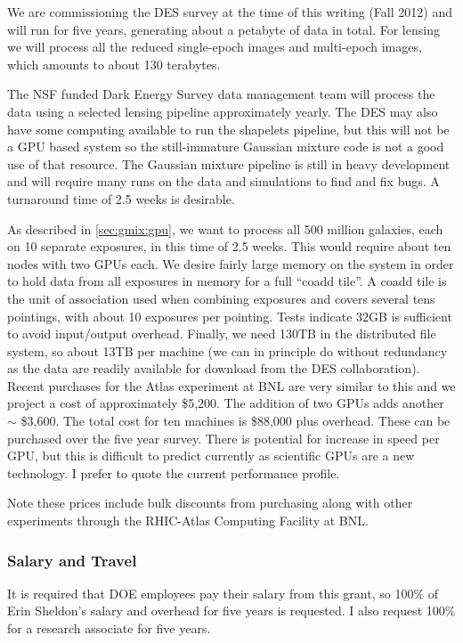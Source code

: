 \documentclass[12pt]{article}
\newcommand{\commissdate}{Fall 2012}
\begin{document}
We are commissioning the DES survey at the time of this writing (\commissdate)
and will run for five years, generating about a petabyte of data in total.  For
lensing we will process all the reduced single-epoch images and multi-epoch
images, which amounts to about 130 terabytes.

The NSF funded Dark Energy Survey data management team will process the data
using a selected lensing pipeline approximately yearly.  The DES may also have
some computing available to run the shapelets pipeline, but this will not be a
GPU based system so the still-immature Gaussian mixture code is not a good use
of that resource.  The Gaussian mixture pipeline is still in heavy development
and will require many runs on the data and simulations to find and fix bugs.  A
turnaround time of 2.5 weeks is desirable.

As described in \ref{sec:gmix:gpu}, we want to process all 500 million
galaxies, each on 10 separate exposures, in this time of 2.5 weeks. This would
require about ten nodes with two GPUs each.  We desire fairly large memory on
the system in order to hold data from all exposures in memory for a full
``coadd tile''. A coadd tile is the unit of association used when combining
exposures and covers several tens pointings, with about 10 exposures per
pointing.  Tests indicate 32GB is sufficient to avoid input/output overhead.
Finally, we need 130TB in the distributed file system, so about 13TB per
machine (we can in principle do without redundancy as the data are readily
available for download from the DES collaboration).  Recent purchases for the
Atlas experiment at BNL are very similar to this and we project a cost of
approximately \$5,200.  The addition of two GPUs adds another $\sim$ \$3,600.
The total cost for ten machines is \$88,000 plus overhead.  These can be
purchased over the five year survey.  There is potential for increase in speed
per GPU, but this is difficult to predict currently as scientific GPUs are a
new technology.  I prefer to quote the current performance profile.

Note these prices include bulk discounts from purchasing along with other
experiments through the RHIC-Atlas Computing Facility at BNL.  



\subsubsection{Salary and Travel}

It is required that DOE employees pay their salary from this grant, so 100\% of
Erin Sheldon's salary and overhead for five years is requested.  I also request
100\% for a research associate for five years.
\end{document}
